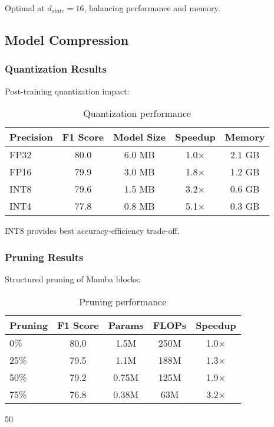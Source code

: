\documentclass[10pt,journal,compsoc]{IEEEtran}
\begin{document}
Optimal at $d_{state}=16$, balancing performance and memory.

\subsection{Model Compression}

\subsubsection{Quantization Results}

Post-training quantization impact:

\begin{table}[h]
\centering
\caption{Quantization performance}
\label{tab:quantization}
\begin{tabular}{lcccc}
\toprule
Precision & F1 Score & Model Size & Speedup & Memory \\
\midrule
FP32 & 80.0 & 6.0 MB & 1.0× & 2.1 GB \\
FP16 & 79.9 & 3.0 MB & 1.8× & 1.2 GB \\
INT8 & 79.6 & 1.5 MB & 3.2× & 0.6 GB \\
INT4 & 77.8 & 0.8 MB & 5.1× & 0.3 GB \\
\bottomrule
\end{tabular}
\end{table}

INT8 provides best accuracy-efficiency trade-off.

\subsubsection{Pruning Results}

Structured pruning of Mamba blocks:

\begin{table}[h]
\centering
\caption{Pruning performance}
\label{tab:pruning}
\begin{tabular}{lcccc}
\toprule
Pruning & F1 Score & Params & FLOPs & Speedup \\
\midrule
0\% & 80.0 & 1.5M & 250M & 1.0× \\
25\% & 79.5 & 1.1M & 188M & 1.3× \\
50\% & 79.2 & 0.75M & 125M & 1.9× \\
75\% & 76.8 & 0.38M & 63M & 3.2× \\
\bottomrule
\end{tabular}
\end{table}

50%
\end{document}
